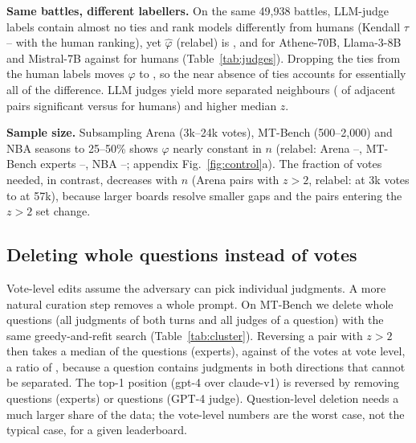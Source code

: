 \documentclass{article}
\newcommand{\kstar}{k^\ast}
\begin{document}
\textbf{Same battles, different labellers.} On the same 49,938 battles, LLM-judge labels contain almost no ties and rank models differently from humans (Kendall $\tau$ \NJmistraltau--\NJathenetau{} with the human ranking), yet $\hat\varphi$ (relabel) is \NJathenephi{}, \NJllamaphi{} and \NJmistralphi{} for Athene-70B, Llama-3-8B and Mistral-7B against \NJhumanphi{} for humans (Table~\ref{tab:judges}). Dropping the ties from the human labels moves $\hat\varphi$ to \NJhumannotiesphi, so the near absence of ties accounts for essentially all of the difference. LLM judges yield more separated neighbours (\NJatheneadjsig{} of adjacent pairs significant versus \NJhumanadjsig{} for humans) and higher median $z$.

\textbf{Sample size.} Subsampling Arena (3k--24k votes), MT-Bench (500--2,000) and NBA seasons to 25--50\% shows $\hat\varphi$ nearly constant in $n$ (relabel: Arena \Nscalephiminarenarelabel--\Nscalephimaxarenarelabel, MT-Bench experts \Nscalephiminmthumanrelabel--\Nscalephimaxmthumanrelabel, NBA \Nscalephiminnbarelabel--\Nscalephimaxnbarelabel; appendix Fig.~\ref{fig:control}a). The fraction of votes needed, in contrast, decreases with $n$ (Arena pairs with $z>2$, relabel: \Nscalealphaarenasmall{} at 3k votes to \Nscalealphaarenafull{} at 57k), because larger boards resolve smaller gaps and the pairs entering the $z>2$ set change.

\begin{table}[t]
\caption{Matched control: the same six models rated by Arena crowd votes (all 1,367 available) and by MT-Bench experts and GPT-4 judgments subsampled to $n=1{,}367$. Medians over the 15 pairs; $\pm$: SD over 30 replicates (random subsamples for MT-Bench, vote bootstrap for Arena). $z$ and $\alpha^\ast=\kstar/n$ over all pairs (including capped ones), $\varphi,\kappa$ over pairs with $z>2$.}\label{tab:matched}
\centering\scriptsize

\end{table}

\subsection{Deleting whole questions instead of votes}\label{sec:cluster}
Vote-level edits assume the adversary can pick individual judgments. A more natural curation step removes a whole prompt. On MT-Bench we delete whole questions (all judgments of both turns and all judges of a question) with the same greedy-and-refit search (Table~\ref{tab:cluster}). Reversing a pair with $z>2$ then takes a median \Nclqmth{} of the \Nclnq{} questions (experts), against \Nclvmth{} of the votes at vote level, a ratio of \Nclratiomth, because a question contains judgments in both directions that cannot be separated. The top-1 position (gpt-4 over claude-v1) is reversed by removing \Ncltopmth{} questions (experts) or \Ncltopmtg{} questions (GPT-4 judge). Question-level deletion needs a much larger share of the data; the vote-level numbers are the worst case, not the typical case, for a given leaderboard.
\end{document}
